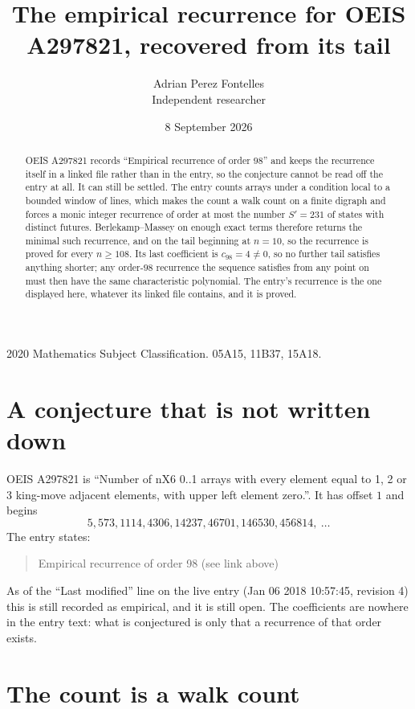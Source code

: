 \documentclass[11pt,a4paper]{article}
\title{The empirical recurrence for OEIS A297821, recovered from its tail}
\author{Adrian Perez Fontelles\\ \small Independent researcher}
\date{8 September 2026}
\theoremstyle{plain}
\theoremstyle{definition}
\begin{document}
\maketitle

\begin{abstract}
OEIS A297821 records ``Empirical recurrence of order $98$'' and keeps the recurrence itself in
a linked file rather than in the entry, so the conjecture cannot be read off the entry at all.
It can still be settled. The entry counts arrays under a condition local to a bounded window of
lines, which makes the count a walk count on a finite digraph and forces a monic integer
recurrence of order at most the number $S'=231$ of states with distinct futures. Berlekamp--Massey on
enough exact terms therefore returns the minimal such recurrence, and on the tail beginning at $n=10$, so the recurrence is proved for every $n\ge108$.
Its last coefficient is $c_{98}=4\neq0$, so no further tail satisfies anything
shorter; any order-$98$ recurrence the sequence satisfies from any point on must then have
the same characteristic polynomial. The entry's recurrence is the one displayed here, whatever
its linked file contains, and it is proved.
\end{abstract}

\noindent\small 2020 Mathematics Subject Classification. 05A15, 11B37, 15A18.\normalsize

\section{A conjecture that is not written down}

OEIS A297821 is ``Number of nX6 0..1 arrays with every element equal to 1, 2 or 3 king-move adjacent elements, with upper left element zero.''. It has offset $1$ and begins
\[
5, 573, 1114, 4306, 14237, 46701, 146530, 456814,\ \dots
\]
The entry states:
\begin{quote}
Empirical recurrence of order 98 (see link above)
\end{quote}
As of the ``Last modified'' line on the live entry (Jan 06 2018 10:57:45, revision 4)
this is still recorded as empirical, and it is still open. The coefficients are nowhere in the
entry text: what is conjectured is only that a recurrence of that order exists.

\section{The count is a walk count}
\end{document}

